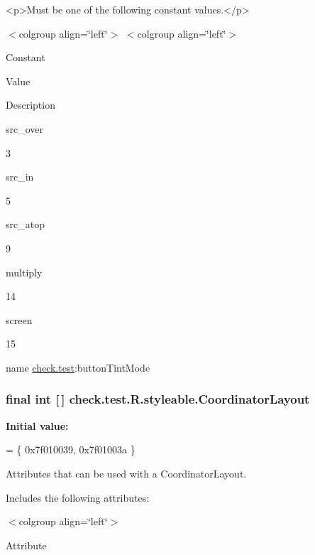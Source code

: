 \begin{DoxyVerb}      <p>Must be one of the following constant values.</p>
\end{DoxyVerb}
 \begin{TabularC}{0}
\hline
\end{TabularC}
$<$colgroup align=\char`\"{}left\char`\"{}$>$ $<$colgroup align=\char`\"{}left\char`\"{}$>$ 

Constant

Value

Description 

{\ttfamily src\+\_\+over}

3

{\ttfamily src\+\_\+in}

5

{\ttfamily src\+\_\+atop}

9

{\ttfamily multiply}

14

{\ttfamily screen}

15

name \hyperlink{namespacecheck_1_1test}{check.\+test}\+:button\+Tint\+Mode \hypertarget{classcheck_1_1test_1_1_r_1_1styleable_af5f8b747fab6f8b93989f42f927f00fc}{}
\subsubsection[{Coordinator\+Layout}]{\setlength{\rightskip}{0pt plus 5cm}final int \mbox{[}$\,$\mbox{]} check.\+test.\+R.\+styleable.\+Coordinator\+Layout\hspace{0.3cm}{\ttfamily [static]}}\label{classcheck_1_1test_1_1_r_1_1styleable_af5f8b747fab6f8b93989f42f927f00fc}
{\bfseries Initial value\+:}
\begin{DoxyCode}
= \{
            0x7f010039, 0x7f01003a
        \}
\end{DoxyCode}
Attributes that can be used with a Coordinator\+Layout. 

Includes the following attributes\+:

\begin{TabularC}{0}
\hline
\end{TabularC}
$<$colgroup align=\char`\"{}left\char`\"{}$>$ 

Attribute

